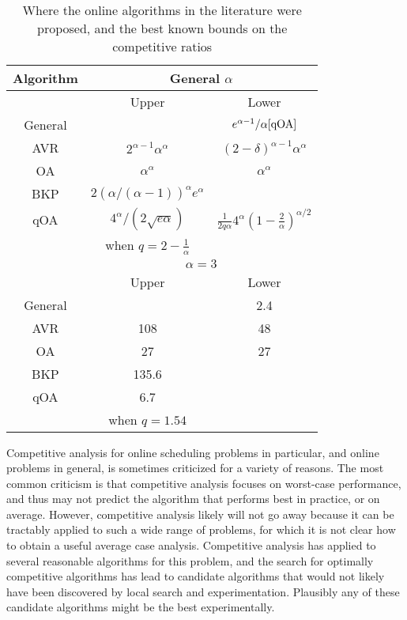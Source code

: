 \documentclass[11pt]{article}
\newcommand{\BKP}{{\rm BKP}}
\newcommand{\AVR}{{\rm AVR}}
\newcommand{\OA}{{\rm OA}}
\newcommand{\qOA}{{\rm qOA}}
\begin{document}
\begin{table}[h]
\centering
\begin{tabular}{|c||c|c|}
\hline
Algorithm&\multicolumn{2}{|c|}{General $\alpha$} \\
\hline
&Upper&Lower\\
\hline
General&&$e^{\alpha-1}/\alpha\cite{qOA}$\\
\hline
\AVR\cite{YDS}&$2^{\alpha-1} \alpha^\alpha$\cite{YDS,BBCP}&$(2-\delta)^{\alpha-1} \alpha^\alpha$\cite{BBCP}\\
\hline
\OA\cite{YDS}&$\alpha^\alpha$\cite{BKP}&$\alpha^\alpha$\cite{YDS}\\
\hline
\BKP\cite{BKP}&$2 (\alpha/(\alpha-1))^\alpha e^\alpha$\cite{BKP}&\\
\hline
\qOA\cite{qOA}&$4^\alpha/(2 \sqrt{e \alpha})$\cite{qOA}&$\frac{1}{2q\alpha}4^\alpha(1-\frac{2}{\alpha})^{\alpha/2}$\cite{qOA}\\
&when $q=2 - \frac{1}{\alpha}$& \\
\hline
\hline
&\multicolumn{2}{|c|}{$\alpha=3$} \\
\hline
&Upper&Lower\\
\hline
General&&2.4\\
\hline
\AVR&108&48\\
\hline
\OA&27&27\\
\hline
\BKP&135.6&\\
\hline
\qOA&6.7&\\
&when $q=1.54$&\\
\hline
\end{tabular}
\caption{Where the online algorithms in the literature were proposed, and the best known bounds on the competitive ratios}
\label{table:CR}
\end{table}



Competitive analysis for online scheduling problems in particular, and online problems in general,
is sometimes criticized for a variety of reasons. The most common criticism is that competitive
analysis focuses on worst-case performance, and thus may not predict
the algorithm that performs best in practice, or on average. 
However, competitive analysis likely will not go
away because it can be tractably applied to such a wide range of problems, 
for which it is
not clear how to obtain a useful average case analysis.
Competitive analysis has applied to several reasonable 
algorithms for this problem, and
the search
for optimally competitive algorithms has lead to candidate algorithms
that
would not likely have been discovered by local search and
experimentation.
Plausibly any of these candidate algorithms might be the best experimentally.
\end{document}
